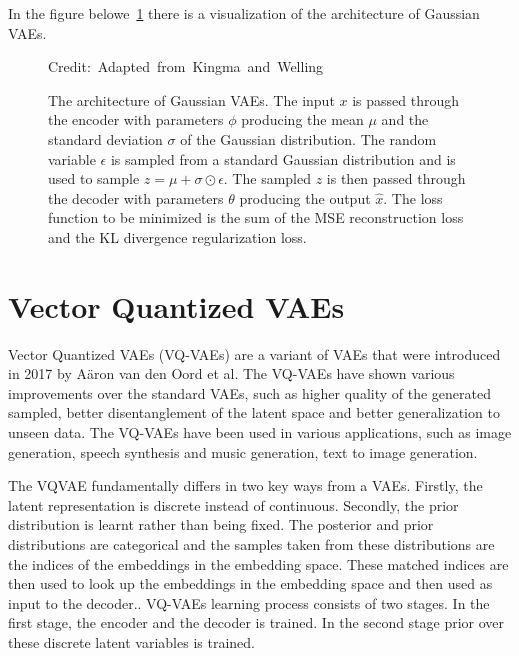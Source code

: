 In the figure belowe~\ref{VAEFigure} there is a visualization of the architecture of Gaussian VAEs.

\begin{figure}[H]
    \centering 
    
    \caption[The architecture of Gaussian VAEs.]%
    { The architecture of Gaussian VAEs. The input $x$ is passed through the encoder with parameters $\phi$ producing the mean $\mu$ and the standard deviation $\sigma$ of the Gaussian distribution. The random variable $\epsilon$ is sampled from a standard Gaussian distribution and is used to sample $ z = \mu + \sigma \odot \epsilon$. The sampled $z$ is then passed through the decoder with parameters $\theta$ producing the output $\hat{x}$. The loss function to be minimized is the sum of the MSE reconstruction loss and the KL divergence regularization loss. 
    }
  	\medskip 
	\hspace*{15pt}\hbox{\scriptsize Credit: Adapted from Kingma and Welling\cite{Kingma_2019} }\label{VAEFigure}
\end{figure}

\section{Vector Quantized VAEs}

Vector Quantized VAEs (VQ-VAEs) are a variant of VAEs that were introduced in 2017 by Aäron van den Oord et al\cite{vqvae}. The VQ-VAEs have shown various improvements over the standard VAEs, such as higher quality of the generated sampled, better disentanglement of the latent space and better generalization to unseen data. The VQ-VAEs have been used in various applications, such as image generation, speech synthesis and music generation, text to image generation.\cite{vqvae2,vqvaespeechsynthesis, musicvqvae,dalle}

The VQVAE fundamentally differs in two key ways from a VAEs. Firstly, the latent representation is discrete instead of continuous. Secondly, the prior distribution is learnt rather than being fixed. The posterior and prior distributions are categorical and the samples taken from these distributions are the indices of the embeddings in the embedding space. These matched indices are then used to look up the embeddings in the embedding space and then used as input to the decoder.\cite{vqvae}. VQ-VAEs learning
process consists of two stages. In the first stage, the encoder and the decoder is trained. In the second stage prior over these discrete latent variables is trained.\cite{vqvae}

